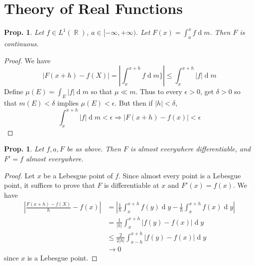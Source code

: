 \documentclass[12pt, a4paper]{book}
\DeclareMathOperator{\R}{\mathbb{R}}
\renewcommand{\d}[1]{\ensuremath{\operatorname{d}\!{#1}}} %
\newtheorem{proposition}[theorem]{Prop.}
\theoremstyle{nonumberplain}
\newtheorem{proof}{Proof}
\begin{document}
\section{Theory of Real Functions}
\begin{proposition}
    Let $f\in L^1(\R)$, $a\in[-\infty,+\infty)$. %
    Let $F(x)=\int_a^x f\d{m}$.
    Then $F$ is continuous.
\end{proposition}
\begin{proof}
    We have
    \begin{equation*}
        |F(x+h)-f(X)| = \left\lvert\int_x^{x+h}f\d{m}\}\right\rvert\leq\int_x^{x+h}|f|\d{m}
    \end{equation*}
    Define $\mu(E)=\int_E|f|\d{m}$ so that $\mu\ll m$.
    Thus to every $\epsilon>0$, get $\delta>0$ so that $m(E)<\delta$ implies $\mu(E)<\epsilon$.
    But then if $|h|<\delta$,
    \begin{equation*}
        \int_x^{x+h}|f|\d{m}<\epsilon\Longrightarrow|F(x+h)-f(x)|<\epsilon
    \end{equation*}
\end{proof}
\begin{proposition}
    Let $f,a,F$ be as above.
    Then $F$ is almost everywhere differentiable, and $F'=f$ almost everywhere.
\end{proposition}
\begin{proof}
    Let $x$ be a Lebesgue point of $f$.
    Since almost every point is a Lebesgue point, it suffices to prove that $F$ is differentiable at $x$ and $F'(x)=f(x)$.
    We have
    \begin{align*}
        \left\lvert\frac{F(x+h)-f(X)}{h}-f(x)\right\rvert &= \left\lvert\frac{1}{h}\int_x^{x+h}f(y)\d{y}-\frac{1}{h}\int_x^{x+h} f(x)\d{y}\right\rvert\\
                                                          &= \frac{1}{|h|}\int_x^{x+h}|f(y)-f(x)|\d{y}\\
                                                          &\leq \frac{2}{2|h|}\int_{x-h}^{x+h}|f(y)-f(x)|\d{y}\\
                                                          &\to 0
    \end{align*}
    since $x$ is a Lebesgue point.
\end{proof}
\end{document}
